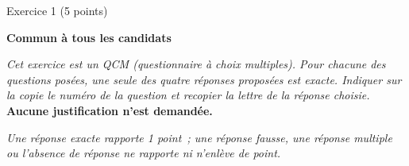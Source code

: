 
%
\begin{h2}Exercice 1 (5 points)\end{h2}
\par
\textbf{Commun  à tous les candidats}
\par
\emph{Cet exercice est un QCM (questionnaire à choix multiples). Pour chacune des questions
     posées, une seule des quatre réponses proposées est exacte. Indiquer sur la copie le
numéro de la question et recopier la lettre de la réponse choisie.}
\medbreak
\textbf{Aucune justification n'est demandée.}
\par
\emph{Une réponse exacte rapporte 1 point~; une réponse fausse, une réponse multiple ou l'absence de réponse ne rapporte ni n'enlève de point.}

